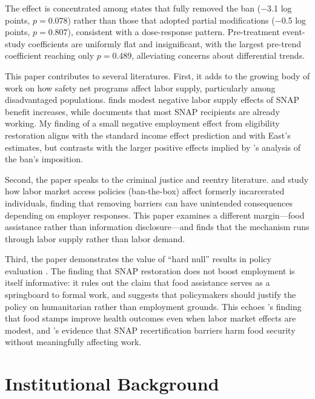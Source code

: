 \documentclass[12pt]{article}
\begin{document}
The effect is concentrated among states that fully removed the ban ($-$3.1 log points, $p = 0.078$) rather than those that adopted partial modifications ($-$0.5 log points, $p = 0.807$), consistent with a dose-response pattern. Pre-treatment event-study coefficients are uniformly flat and insignificant, with the largest pre-trend coefficient reaching only $p = 0.489$, alleviating concerns about differential trends.

This paper contributes to several literatures. First, it adds to the growing body of work on how safety net programs affect labor supply, particularly among disadvantaged populations. \citet{east2020effect} finds modest negative labor supply effects of SNAP benefit increases, while \citet{ganong2018people} documents that most SNAP recipients are already working. My finding of a small negative employment effect from eligibility restoration aligns with the standard income effect prediction and with East's estimates, but contrasts with the larger positive effects implied by \citet{tuttle2019snap}'s analysis of the ban's imposition.

Second, the paper speaks to the criminal justice and reentry literature. \citet{yang2017does} and \citet{doleac2020unintended} study how labor market access policies (ban-the-box) affect formerly incarcerated individuals, finding that removing barriers can have unintended consequences depending on employer responses. This paper examines a different margin---food assistance rather than information disclosure---and finds that the mechanism runs through labor supply rather than labor demand.

Third, the paper demonstrates the value of ``hard null'' results in policy evaluation \citep{abadie2020statistical}. The finding that SNAP restoration does not boost employment is itself informative: it rules out the claim that food assistance serves as a springboard to formal work, and suggests that policymakers should justify the policy on humanitarian rather than employment grounds. This echoes \citet{hoynes2012snap}'s finding that food stamps improve health outcomes even when labor market effects are modest, and \citet{homonoff2021does}'s evidence that SNAP recertification barriers harm food security without meaningfully affecting work.

\section{Institutional Background}
\end{document}
